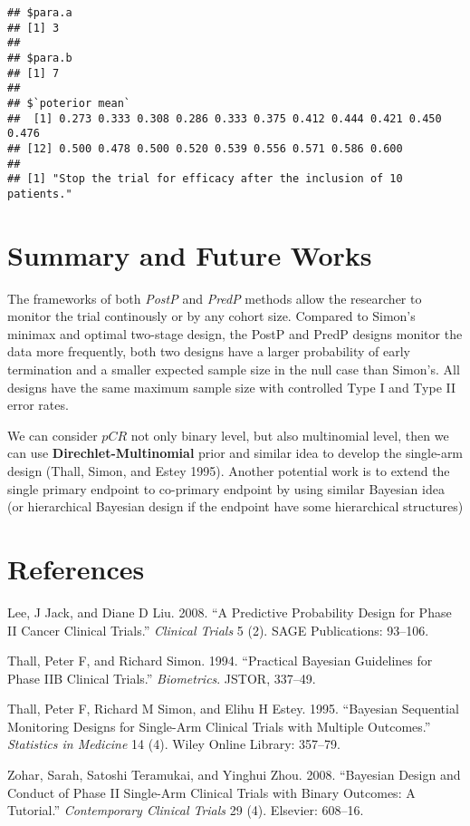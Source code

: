 \documentclass[]{article}
\begin{document}
\begin{verbatim}
## $para.a
## [1] 3
## 
## $para.b
## [1] 7
## 
## $`poterior mean`
##  [1] 0.273 0.333 0.308 0.286 0.333 0.375 0.412 0.444 0.421 0.450 0.476
## [12] 0.500 0.478 0.500 0.520 0.539 0.556 0.571 0.586 0.600
## 
## [1] "Stop the trial for efficacy after the inclusion of 10 patients."
\end{verbatim}


\section{Summary and Future Works}\label{summary-and-future-works}

The frameworks of both \emph{PostP} and \emph{PredP} methods allow the
researcher to monitor the trial continously or by any cohort size.
Compared to Simon's minimax and optimal two-stage design, the PostP and
PredP designs monitor the data more frequently, both two designs have a
larger probability of early termination and a smaller expected sample
size in the null case than Simon's. All designs have the same maximum
sample size with controlled Type I and Type II error rates.

We can consider \(pCR\) not only binary level, but also multinomial
level, then we can use \textbf{Direchlet-Multinomial} prior and similar
idea to develop the single-arm design (Thall, Simon, and Estey 1995).
Another potential work is to extend the single primary endpoint to
co-primary endpoint by using similar Bayesian idea (or hierarchical
Bayesian design if the endpoint have some hierarchical structures)

\section*{References}\label{references}

\hypertarget{refs}{}
\hypertarget{ref-lee2008predictive}{}
Lee, J Jack, and Diane D Liu. 2008. ``A Predictive Probability Design
for Phase II Cancer Clinical Trials.'' \emph{Clinical Trials} 5 (2).
SAGE Publications: 93--106.

\hypertarget{ref-thall1994practical}{}
Thall, Peter F, and Richard Simon. 1994. ``Practical Bayesian Guidelines
for Phase IIB Clinical Trials.'' \emph{Biometrics}. JSTOR, 337--49.

\hypertarget{ref-thall1995bayesian}{}
Thall, Peter F, Richard M Simon, and Elihu H Estey. 1995. ``Bayesian
Sequential Monitoring Designs for Single-Arm Clinical Trials with
Multiple Outcomes.'' \emph{Statistics in Medicine} 14 (4). Wiley Online
Library: 357--79.

\hypertarget{ref-zohar2008bayesian}{}
Zohar, Sarah, Satoshi Teramukai, and Yinghui Zhou. 2008. ``Bayesian
Design and Conduct of Phase II Single-Arm Clinical Trials with Binary
Outcomes: A Tutorial.'' \emph{Contemporary Clinical Trials} 29 (4).
Elsevier: 608--16.
\end{document}
